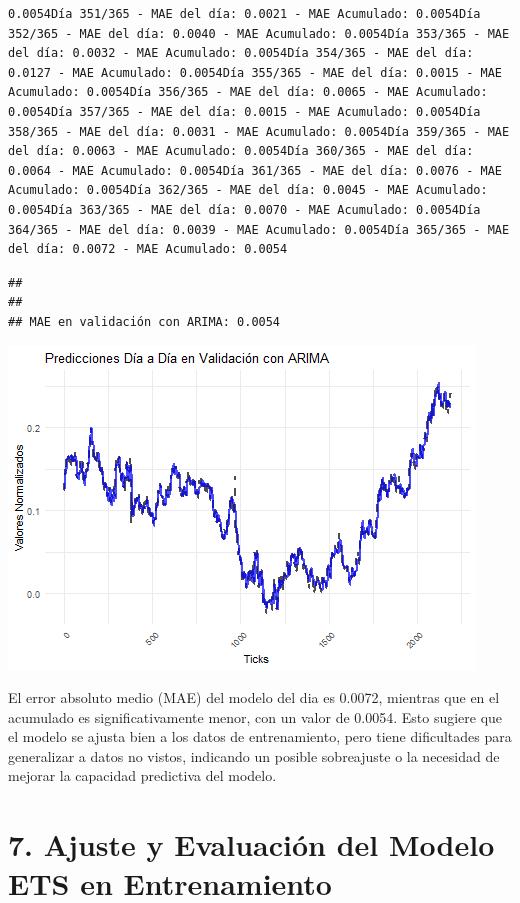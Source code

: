 \documentclass[
]{book}
\begin{document}
\begin{verbatim}
0.0054Día 351/365 - MAE del día: 0.0021 - MAE Acumulado: 0.0054Día 352/365 - MAE del día: 0.0040 - MAE Acumulado: 0.0054Día 353/365 - MAE del día: 0.0032 - MAE Acumulado: 0.0054Día 354/365 - MAE del día: 0.0127 - MAE Acumulado: 0.0054Día 355/365 - MAE del día: 0.0015 - MAE Acumulado: 0.0054Día 356/365 - MAE del día: 0.0065 - MAE Acumulado: 0.0054Día 357/365 - MAE del día: 0.0015 - MAE Acumulado: 0.0054Día 358/365 - MAE del día: 0.0031 - MAE Acumulado: 0.0054Día 359/365 - MAE del día: 0.0063 - MAE Acumulado: 0.0054Día 360/365 - MAE del día: 0.0064 - MAE Acumulado: 0.0054Día 361/365 - MAE del día: 0.0076 - MAE Acumulado: 0.0054Día 362/365 - MAE del día: 0.0045 - MAE Acumulado: 0.0054Día 363/365 - MAE del día: 0.0070 - MAE Acumulado: 0.0054Día 364/365 - MAE del día: 0.0039 - MAE Acumulado: 0.0054Día 365/365 - MAE del día: 0.0072 - MAE Acumulado: 0.0054
\end{verbatim}

\begin{verbatim}
## 
## 
## MAE en validación con ARIMA: 0.0054
\end{verbatim}

\includegraphics{bookdown_time_series_files/figure-latex/unnamed-chunk-16-1.png}

El error absoluto medio (MAE) del modelo del dia es 0.0072, mientras que en el acumulado es significativamente menor, con un valor de 0.0054. Esto sugiere que el modelo se ajusta bien a los datos de entrenamiento, pero tiene dificultades para generalizar a datos no vistos, indicando un posible sobreajuste o la necesidad de mejorar la capacidad predictiva del modelo.

\section{7. Ajuste y Evaluación del Modelo ETS en Entrenamiento}\label{ajuste-y-evaluaciuxf3n-del-modelo-ets-en-entrenamiento}
\end{document}
